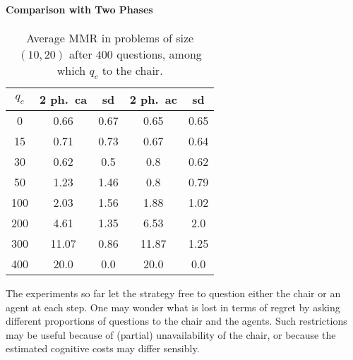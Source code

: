 \documentclass[runningheads]{llncs}
\begin{document}
\paragraph{Comparison with Two Phases}

\begin{table}
	\caption{Average MMR in problems of size $(10, 20)$ after $400$ questions, among which $q_c$ to the chair.}
	\label{tab:twoP400}
	\begin{tabular}{S[table-figures-integer=3, table-figures-decimal=0]S[table-number-alignment = right]@{ ± }S[table-number-alignment = left, table-figures-integer=1]S[table-number-alignment = right]@{ ± }S[table-number-alignment = left, table-figures-integer=1]}
		\toprule
		{$q_c$} & {2 ph.\ ca} & {sd} & {2 ph.\ ac} & {sd} \\
		 & 0.66 & 0.67 & 0.65 & 0.65  \\
		15 & 0.71 & 0.73 & 0.67	& 0.64 \\
		30 & 0.62 & 0.5 & 0.8 & 0.62 \\
		50 & 1.23 & 1.46 & 0.8 & 0.79 \\
		100 & 2.03 & 1.56 & 1.88 & 1.02  \\
		200 & 4.61	& 1.35  & 6.53 & 2.0  \\
		300 &11.07 & 0.86& 11.87 & 1.25 \\
		400 &20.0 & 0.0 & 20.0 & 0.0 \\
		\bottomrule
	\end{tabular}
\end{table}

The experiments so far let the strategy free to question either the chair or an agent at each step. One may wonder what is lost in terms of regret by asking different proportions of questions to the chair and the agents. Such restrictions may be useful because of (partial) unavailability of the chair, or because the estimated cognitive costs may differ sensibly. %
\end{document}
